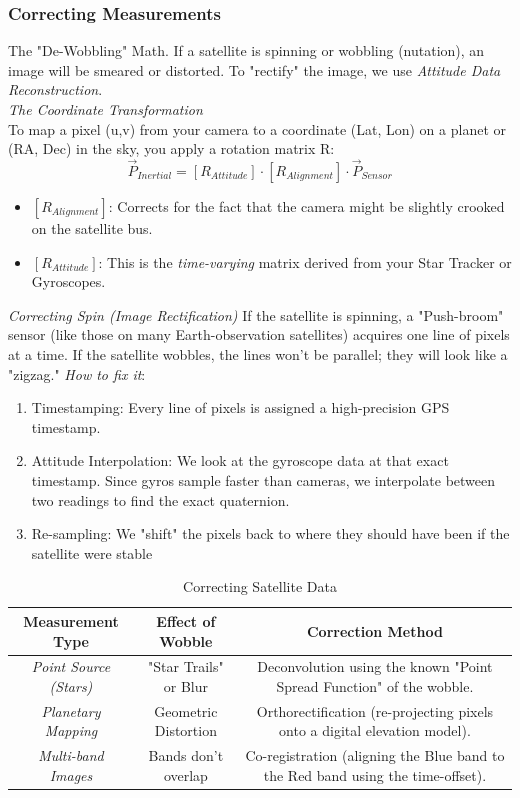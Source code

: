 \documentclass[a4paper,10pt]{article}
\begin{document}
\subsubsection{Correcting Measurements}
The "De-Wobbling" Math. If a satellite is spinning or wobbling (nutation), an image will be smeared or distorted. To "rectify" the image, we use \emph{Attitude Data Reconstruction}.\\
\emph{The Coordinate Transformation}\\
To map a pixel (u,v) from your camera to a coordinate (Lat, Lon) on a planet or (RA, Dec) in the sky, you apply a rotation matrix R:
\[
 \vec{P}_{Inertial} = [R_{Attitude}] \cdot  [R_{Alignment}] \cdot \vec{P}_{Sensor}
\]
\begin{itemize}
\item \([R_{Alignment}]\): Corrects for the fact that the camera might be slightly crooked on the satellite bus.
\item \([R_{Attitude}]\): This is the \emph{time-varying} matrix derived from your Star Tracker or Gyroscopes.
\end{itemize}
\emph{Correcting Spin (Image Rectification)}
If the satellite is spinning, a "Push-broom" sensor (like those on many Earth-observation satellites) acquires one line of pixels at a time. If the satellite wobbles, the lines won't be parallel; they will look like a "zigzag."
\emph{How to fix it}:\\
\begin{enumerate}
\item Timestamping: Every line of pixels is assigned a high-precision GPS timestamp.
\item Attitude Interpolation: We look at the gyroscope data at that exact timestamp. Since gyros sample faster than cameras, we interpolate between two readings to find the exact quaternion.
\item Re-sampling: We "shift" the pixels back to where they should have been if the satellite were stable
\end{enumerate}
\begin{table}[h!]
\begin{center}
\begin{tabular}{|c|c|c|}
\hline
\textbf{Measurement Type}&\textbf{Effect of Wobble}&\textbf{Correction Method}\\
\hline
\emph{Point Source (Stars)}&"Star Trails" or Blur & {\tiny Deconvolution using the known "Point Spread Function" of the wobble.}\\
\hline
\emph{Planetary Mapping}&Geometric Distortion & {\tiny Orthorectification (re-projecting pixels onto a digital elevation model).}\\
\hline
\emph{Multi-band Images}&Bands don't overlap & {\tiny Co-registration (aligning the Blue band to the Red band using the time-offset).}\\
\hline
\end{tabular}
\end{center}
\caption{Correcting Satellite Data}
\end{table}
\end{document}
